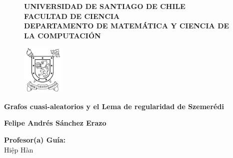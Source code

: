 
\begin{titlepage}


\begin{figure}[ht]
\hspace{0.1\linewidth}
\begin{minipage}[b]{0.75\linewidth}
\begin{center}
\textbf{\Large{UNIVERSIDAD DE SANTIAGO DE CHILE}}\\
\textbf{FACULTAD DE CIENCIA}\\
\textbf{DEPARTAMENTO DE MATEMÁTICA Y CIENCIA DE LA COMPUTACIÓN}
\end{center}	
\end{minipage}
\begin{minipage}[b]{0.1\linewidth}
\centering
\includegraphics[width=2cm]{Imágenes/logo5}
\end{minipage}
\end{figure}

\begin{center}
\vspace{2.5cm}

\begin{center}
\Large{\textbf{Grafos cuasi-aleatorios y el Lema de regularidad de Szemerédi}}
\end{center}
\smallskip

\begin{center}
{\textbf{Felipe Andrés Sánchez Erazo}}
\end{center}
\vspace{2.5cm}

\hspace{0.45\linewidth}
\begin{minipage}[b]{0.45\linewidth}
\begin{flushleft}
\textbf{Profesor(a) Guía:}\\
Hi\d{ê}p Hàn
\end{flushleft}
\end{minipage}


\end{center}
\end{titlepage}
